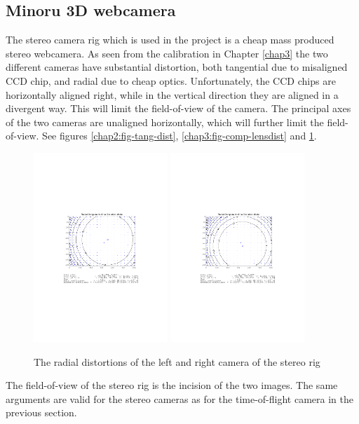 \subsection{Minoru 3D webcamera}
The stereo camera rig which is used in the project is a cheap mass produced stereo
webcamera. As seen from the calibration in Chapter \ref{chap3} the two different cameras have substantial
distortion, both tangential due to misaligned CCD chip, and radial due to cheap optics.
Unfortunately, the CCD chips are horizontally aligned right, while in the vertical
direction they are aligned in a divergent way. This will limit the field-of-view of the
camera. The principal axes of the two cameras are unaligned horizontally, which will
further limit the field-of-view. See figures \ref{chap2:fig-tang-dist},
\ref{chap3:fig-comp-lensdist} and \ref{chap8:fig-rad-dist}.
\begin{figure}[htbp]
    \centering
    \includegraphics[width=0.45\textwidth]{pics/left_rad_dist}
    \includegraphics[width=0.45\textwidth]{pics/right_rad_dist}
    \caption{The radial distortions of the left and right camera of the stereo rig}
    \label{chap8:fig-rad-dist}
\end{figure}
The field-of-view of the stereo rig is the incision of the two images. The same arguments
are valid for the stereo cameras as for the time-of-flight camera in the previous section. 

